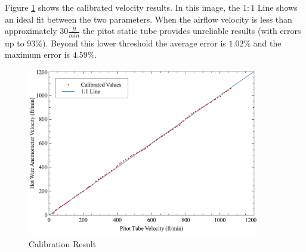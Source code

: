 \documentclass[]{article}
\begin{document}
\noindent
Figure \ref{fig:result} shows the calibrated velocity results.  In this image, the $1:1$ Line shows an ideal fit between the two parameters.  When the airflow velocity is less than approximately $30 \frac{ft}{min}$ the pitot static tube provides unreliable results (with errors up to $93\%$).  Beyond this lower threshold the average error is $1.02\%$ and the maximum error is $4.59\%$.

\begin{figure}[H]
	\centering\includegraphics[width=0.9\textwidth]{cardCalibration_03}
	\caption{Calibration Result}
	\label{fig:result}
\end{figure}
\end{document}
